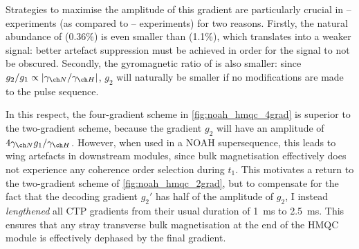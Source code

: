 Strategies to maximise the amplitude of this gradient are particularly crucial in \proton{}--\nitrogen{} experiments (as compared to \proton{}--\carbon{} experiments) for two reasons.
Firstly, the natural abundance of \nitrogen{} (0.36\%) is even smaller than \carbon{} (1.1\%), which translates into a weaker signal: better artefact suppression must be achieved in order for the signal to not be obscured.
Secondly, the gyromagnetic ratio of \nitrogen{} is also smaller: since $g_2/g_1 \propto |\gammaN/\gammaH|$, $g_2$ will naturally be smaller if no modifications are made to the pulse sequence.

In this respect, the four-gradient scheme in \cref{fig:noah_hmqc_4grad} is superior to the two-gradient scheme, because the gradient $g_2$ will have an amplitude of $4\gammaN g_1/\gammaH$.
However, when used in a NOAH supersequence, this leads to wing artefacts in downstream modules, since bulk  magnetisation effectively does not experience any coherence order selection during $t_1$.
This motivates a return to the two-gradient scheme of \cref{fig:noah_hmqc_2grad}, but to compensate for the fact that the decoding gradient $g_2'$ has half of the amplitude of $g_2$, I instead \textit{lengthened} all CTP gradients from their usual duration of \qty{1}{\ms} to \qty{2.5}{\ms}.
This ensures that any stray transverse bulk magnetisation at the end of the HMQC module is effectively dephased by the final gradient.

